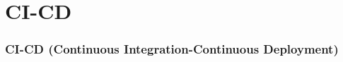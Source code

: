\setcounter{section}{0}
\part{CI-CD}\label{sec:briefCI-CD}

\section{CI-CD (Continuous Integration-Continuous Deployment)}


\newpage